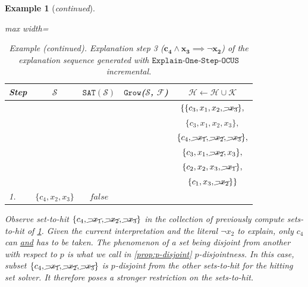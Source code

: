 \documentclass[twoside,11pt]{article}
\newcommand\m[1]{\mathcal{#1}}
\newtheorem{example}{Example}
\newcommand\comment[1]{\marginpar{\tiny #1}}
\renewcommand\comment[1]{#1}
\newcommand{\tias}[1]{{\comment{\color{blue}Tias:#1}}}
\newcommand{\bart}[1]{{\comment{\color{OliveGreen}Bart: #1}}}
\newcommand\setstohit{\ensuremath{\m{H} }\xspace}
\newcommand\formula{\ensuremath{\m{F} }\xspace}
\newcommand\mm[1]{\ensuremath{#1}\xspace}
\newcommand\call[1]{\mm{\texttt{#1}}}
\newcommand\sat{\texttt{{SAT}}\xspace}
\newcommand\grow{\mm{\call{Grow}}}
\newcommand\onestepo{\ensuremath{\call{Explain-One-Step-OCUS}}\xspace}
\begin{document}
\begin{example}[\textit{continued}]
\begin{table}[!h]
	\centering
	\begin{adjustbox}{max width=\textwidth}
	\begin{tabular}{lcccc} 
		Step & $\m{S}$                             & $\sat(\m{S})$    & \grow($\m{S}$, $\formula$)                                 & $\setstohit  \gets \setstohit  \cup \m{K}$ \\ \toprule[2pt]
			&    &  &     &  $\{ \{c_3, {x_1}, x_2,\cancel{\lnot x_3} \}, $                                \\
			&    &  &     &  $\{c_3, {x_1} , x_2 , {x_3}\}, $                                \\
			&    &  &     &  $\{c_4, \cancel{\lnot x_1} ,\cancel{\lnot x_2} , \cancel{\lnot x_3}\}, $                                \\
			&    &  &     &  $\{c_3, {x_1} , \cancel{\lnot x_2} , {x_3}\}, $                                \\
			&    &  &     &  $\{c_2, x_2, {x_3},  \cancel{\lnot x_1}\}, $                                \\
			&    &  &     &  $\{ c_1, {x_3},  \cancel{\lnot x_2}\}\}$                                \\\midrule
		1. &  $\{ c_4, x_2, x_3  \}$  & $\mathit{false}$ & \phantom{$\{ c_1,  c_3, c_4, x_1, \lnot x_2,\lnot x_3 \}$}    & \phantom{$\{..., \{ c_2, \lnot x_2, \lnot x_3\}\}$ }\\
	\end{tabular}
	\end{adjustbox}
	\caption{\textit{Example (continued)}. Explanation step 3 ($\mathbf{c_4 \wedge x_3 \implies \lnot x_2}$) of the explanation sequence generated with \onestepo \emph{incremental}. }
	\label{tab:example-explanation-generation:incr:step3}
\end{table}
Observe set-to-hit $\{ c_4, \cancel{\lnot x_1}, \cancel{\lnot x_2}, \cancel{\lnot x_3}\}$ in the collection of previously compute sets-to-hit of \cref{tab:example-explanation-generation:incr:step3}. Given the current interpretation and the literal $\lnot x_2$ to explain, only $c_4$ can \underline{and} has to be taken. 
The phenomenon of a set being disjoint from another with respect to $p$ is what we call in \cref{prop:p-disjoint} $p$-disjointness.
In this case, subset $\{ c_4, \cancel{\lnot x_1}, \cancel{\lnot x_2}, \cancel{\lnot x_3}\}$ is $p$-disjoint from the other sets-to-hit for the hitting set solver. It therefore poses a stronger restriction on the sets-to-hit. 

\end{example}
\end{document}
